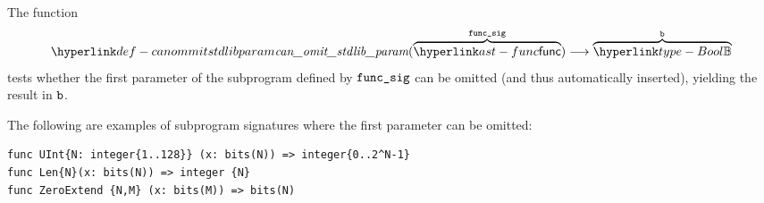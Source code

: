 \FormallyParagraph
\begin{mathpar}
\end{mathpar}

\begin{mathpar}
\end{mathpar}

\hypertarget{def-canommitstdlibparam}{}
The function
\[
  \canommitstdlibparam(\overname{\func}{\funcsig}) \aslto \overname{\Bool}{\vb}
\]
tests whether the first parameter of the subprogram defined by
$\funcsig$ can be omitted (and thus automatically inserted), yielding the result in $\vb$.

The following are examples of subprogram signatures
where the first parameter can be omitted:
\begin{lstlisting}
func UInt{N: integer{1..128}} (x: bits(N)) => integer{0..2^N-1}
func Len{N}(x: bits(N)) => integer {N}
func ZeroExtend {N,M} (x: bits(M)) => bits(N)
\end{lstlisting}

